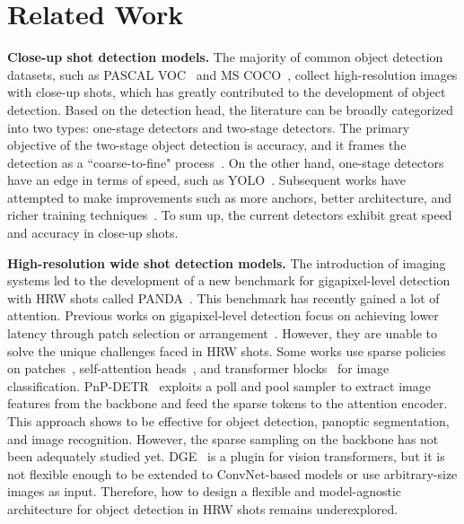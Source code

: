 \section{Related Work}
\noindent\textbf{Close-up shot detection models.}
%
The majority of common object detection datasets, such as PASCAL VOC~\cite{everingham2010pascal} and MS COCO~\cite{lin2014microsoft}, collect high-resolution images with close-up shots, which has greatly contributed to the development of object detection. Based on the detection head, the literature can be broadly categorized into two types: one-stage detectors and two-stage detectors. The primary objective of the two-stage object detection is accuracy, and it frames the detection as a ``coarse-to-fine" process~\cite{girshick2014rich, girshick2015fast, ren2015faster, he2017mask, cai2018cascade}. On the other hand, one-stage detectors have an edge in terms of speed, such as YOLO~\cite{redmon2016you}. Subsequent works have attempted to make improvements such as more anchors, better architecture, and richer training techniques~\cite{redmon2018yolov3, yolox2021, liu2016ssd}. To sum up, the current detectors exhibit great speed and accuracy in close-up shots.

\vspace{2mm}\noindent\textbf{High-resolution wide shot detection models.}
%
The introduction of imaging systems led to the development of a new benchmark for gigapixel-level detection with HRW shots called PANDA~\cite{wang2020panda}. This benchmark has recently gained a lot of attention. Previous works on gigapixel-level detection focus on achieving lower latency through patch selection or arrangement~\cite{najibi2019autofocus,fan2022speed,chen2022towards,li2024saccadedet,li2024saccademot}. However, they are unable to solve the unique challenges faced in HRW shots. Some works use sparse policies on patches~\cite{rao2021dynamicvit}, self-attention heads~\cite{meng2022adavit}, and transformer blocks~\cite{meng2022adavit} for image classification. PnP-DETR~\cite{wang2021pnp} exploits a poll and pool sampler to extract image features from the backbone and feed the sparse tokens to the attention encoder. This approach shows to be effective for object detection, panoptic segmentation, and image recognition. However, the sparse sampling on the backbone has not been adequately studied yet. 
%
DGE~\cite{song2021dynamic} is a plugin for vision transformers, but it is not flexible enough to be extended to ConvNet-based models or use arbitrary-size images as input. Therefore, how to design a flexible and model-agnostic architecture for object detection in HRW shots remains underexplored.

